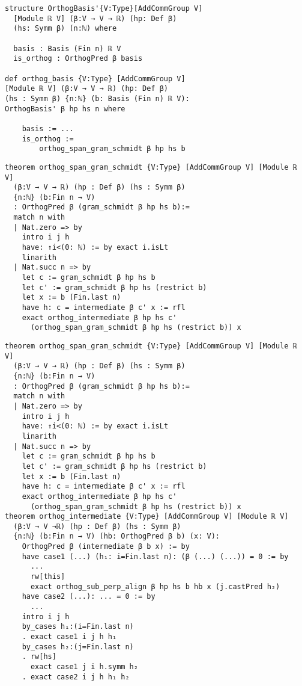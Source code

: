 \documentclass{beamer}
\begin{document}
\newpage 

\begin{verbatim}
structure OrthogBasis'{V:Type}[AddCommGroup V] 
  [Module ℝ V] (β:V → V → ℝ) (hp: Def β)
  (hs: Symm β) (n:ℕ) where
  
  basis : Basis (Fin n) ℝ V
  is_orthog : OrthogPred β basis

def orthog_basis {V:Type} [AddCommGroup V] 
[Module ℝ V] (β:V → V → ℝ) (hp: Def β)
(hs : Symm β) {n:ℕ} (b: Basis (Fin n) ℝ V):
OrthogBasis' β hp hs n where
    
    basis := ...
    is_orthog := 
        orthog_span_gram_schmidt β hp hs b
\end{verbatim}

\newpage

{
\tiny
\begin{verbatim}
theorem orthog_span_gram_schmidt {V:Type} [AddCommGroup V] [Module ℝ V]
  (β:V → V → ℝ) (hp : Def β) (hs : Symm β)
  {n:ℕ} (b:Fin n → V)
  : OrthogPred β (gram_schmidt β hp hs b):=
  match n with
  | Nat.zero => by
    intro i j h
    have: ↑i<(0: ℕ) := by exact i.isLt
    linarith
  | Nat.succ n => by
    let c := gram_schmidt β hp hs b
    let c' := gram_schmidt β hp hs (restrict b)
    let x := b (Fin.last n)
    have h: c = intermediate β c' x := rfl
    exact orthog_intermediate β hp hs c' 
      (orthog_span_gram_schmidt β hp hs (restrict b)) x 
\end{verbatim}
}


\newpage

{
\tiny
\begin{verbatim}
theorem orthog_span_gram_schmidt {V:Type} [AddCommGroup V] [Module ℝ V]
  (β:V → V → ℝ) (hp : Def β) (hs : Symm β)
  {n:ℕ} (b:Fin n → V)
  : OrthogPred β (gram_schmidt β hp hs b):=
  match n with
  | Nat.zero => by
    intro i j h
    have: ↑i<(0: ℕ) := by exact i.isLt
    linarith
  | Nat.succ n => by
    let c := gram_schmidt β hp hs b
    let c' := gram_schmidt β hp hs (restrict b)
    let x := b (Fin.last n)
    have h: c = intermediate β c' x := rfl
    exact orthog_intermediate β hp hs c' 
      (orthog_span_gram_schmidt β hp hs (restrict b)) x 
theorem orthog_intermediate {V:Type} [AddCommGroup V] [Module ℝ V]
  (β:V → V →ℝ) (hp : Def β) (hs : Symm β)
  {n:ℕ} (b:Fin n → V) (hb: OrthogPred β b) (x: V):
    OrthogPred β (intermediate β b x) := by
    have case1 (...) (h₁: i=Fin.last n): (β (...) (...)) = 0 := by
      ... 
      rw[this]
      exact orthog_sub_perp_align β hp hs b hb x (j.castPred h₂)
    have case2 (...): ... = 0 := by
      ...
    intro i j h
    by_cases h₁:(i=Fin.last n)
    . exact case1 i j h h₁
    by_cases h₂:(j=Fin.last n)
    . rw[hs]
      exact case1 j i h.symm h₂
    . exact case2 i j h h₁ h₂
\end{verbatim}
}
\end{document}
